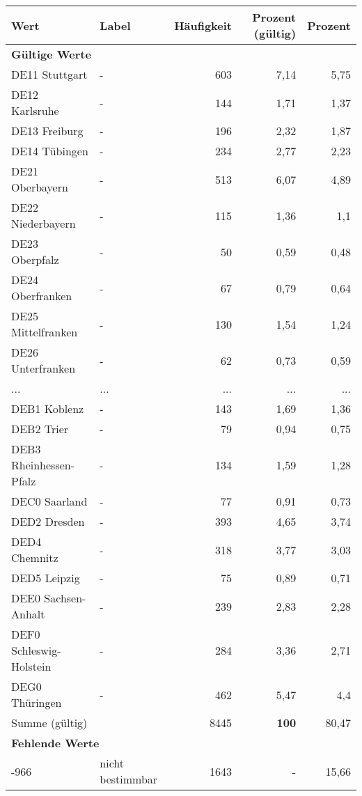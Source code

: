      \begin{longtable}{Xlrrr}
     \toprule
     \textbf{Wert} & \textbf{Label} & \textbf{Häufigkeit} & \textbf{Prozent (gültig)} & \textbf{Prozent} \\
     \endhead
     \midrule
     \multicolumn{5}{l}{\textbf{Gültige Werte}}\\
        \multicolumn{1}{X}{DE11 Stuttgart} & - & 603 & 7,14 & 5,75 \\
        \multicolumn{1}{X}{DE12 Karlsruhe} & - & 144 & 1,71 & 1,37 \\
        \multicolumn{1}{X}{DE13 Freiburg} & - & 196 & 2,32 & 1,87 \\
        \multicolumn{1}{X}{DE14 Tübingen} & - & 234 & 2,77 & 2,23 \\
        \multicolumn{1}{X}{DE21 Oberbayern} & - & 513 & 6,07 & 4,89 \\
        \multicolumn{1}{X}{DE22 Niederbayern} & - & 115 & 1,36 & 1,1 \\
        \multicolumn{1}{X}{DE23 Oberpfalz} & - & 50 & 0,59 & 0,48 \\
        \multicolumn{1}{X}{DE24 Oberfranken} & - & 67 & 0,79 & 0,64 \\
        \multicolumn{1}{X}{DE25 Mittelfranken} & - & 130 & 1,54 & 1,24 \\
        \multicolumn{1}{X}{DE26 Unterfranken} & - & 62 & 0,73 & 0,59 \\
       ... & ... & ... & ... & ... \\
        \multicolumn{1}{X}{DEB1 Koblenz} & - & 143 & 1,69 & 1,36 \\
        \multicolumn{1}{X}{DEB2 Trier} & - & 79 & 0,94 & 0,75 \\
        \multicolumn{1}{X}{DEB3 Rheinhessen-Pfalz} & - & 134 & 1,59 & 1,28 \\
        \multicolumn{1}{X}{DEC0 Saarland} & - & 77 & 0,91 & 0,73 \\
        \multicolumn{1}{X}{DED2 Dresden} & - & 393 & 4,65 & 3,74 \\
        \multicolumn{1}{X}{DED4 Chemnitz} & - & 318 & 3,77 & 3,03 \\
        \multicolumn{1}{X}{DED5 Leipzig} & - & 75 & 0,89 & 0,71 \\
        \multicolumn{1}{X}{DEE0 Sachsen-Anhalt} & - & 239 & 2,83 & 2,28 \\
        \multicolumn{1}{X}{DEF0 Schleswig-Holstein} & - & 284 & 3,36 & 2,71 \\
        \multicolumn{1}{X}{DEG0 Thüringen} & - & 462 & 5,47 & 4,4 \\
     \midrule
      \multicolumn{2}{l}{Summe (gültig)} & 8445 &
      \textbf{100} &
         80,47 \\
     \multicolumn{5}{l}{\textbf{Fehlende Werte}}\\
       -966 & nicht bestimmbar & 1643 & - & 15,66 \\


\end{longtable}
